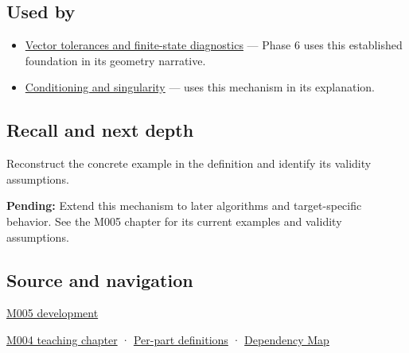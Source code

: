 \subsection{Used by}\label{appendix-0ec599f8ba27-used-by}

\begin{itemize}
\item
  \hyperref[appendix-b5b83329215b]{Vector tolerances and finite-state diagnostics} --- Phase 6 uses this established foundation in its geometry narrative.
\item
  \hyperref[appendix-8f6a01f284a7]{Conditioning and singularity} --- uses this mechanism in its explanation.
\end{itemize}

\subsection{Recall and next depth}\label{appendix-0ec599f8ba27-recall-and-next-depth}

Reconstruct the concrete example in the definition and identify its validity assumptions.

\textbf{Pending:} Extend this mechanism to later algorithms and target-specific behavior. See the M005 chapter for its current examples and validity assumptions.

\subsection{Source and navigation}\label{appendix-0ec599f8ba27-source-and-navigation}

\hyperref[01-foundations-i-ch001-when-arithmetic-meets-uncertainty]{M005 development}

\hyperref[01-foundations-i-ch001-a-stretching-ruler-for-real-valued-quantities]{M004 teaching chapter} · \hyperref[appendix-fd090d982a15-m004---parts-61-76]{Per-part definitions} · \hyperref[appendix-4ad47bdd269a]{Dependency Map}
